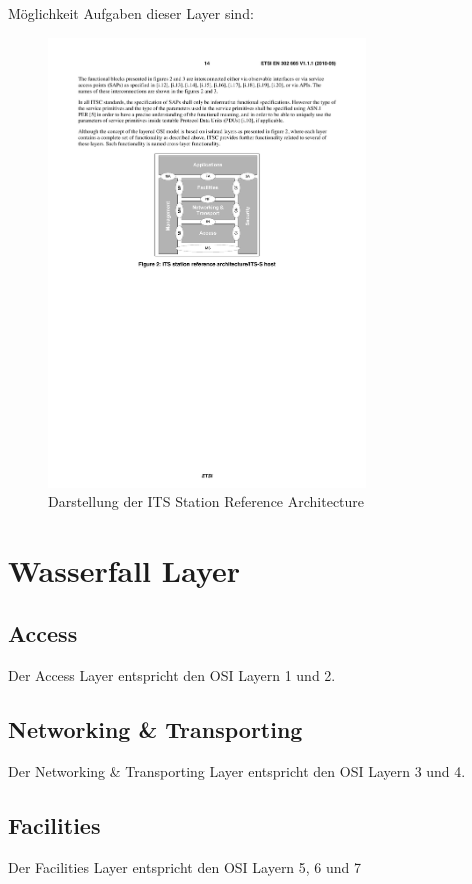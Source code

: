 Möglichkeit Aufgaben dieser Layer sind:



\begin{figure}
\includegraphics[width=0.75\textwidth]{content/images/02_architektur/stationReferenceArchitecture.pdf}
\caption{Darstellung der ITS Station Reference Architecture \cite{etsi2010302}}
\label{fig:funktionsweise_referenceArchitecture}
\end{figure}

\section{Wasserfall Layer}
\subsection{Access}
Der Access Layer entspricht den \ac{OSI} Layern 1 und 2. 

\subsection{Networking \& Transporting}
Der Networking \& Transporting Layer entspricht den \ac{OSI} Layern 3 und 4.

\subsection{Facilities}
Der Facilities Layer entspricht den \ac{OSI} Layern 5, 6 und 7

